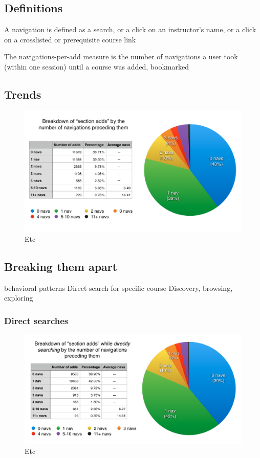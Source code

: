\subsection{Definitions}

A navigation is defined as
a search, or
a click on an instructor’s name, or
a click on a crosslisted or prerequisite course link

The navigations-per-add measure is
the number of navigations a user took (within one session) until a course was added, bookmarked

\subsection{Trends}

\begin{figure}
  \centering
  \includegraphics[width=1.0\textwidth]{images/graph/combined_navs}

  \caption{Etc}
  \label{fig:searchtypes}
\end{figure}

\subsection{Breaking them apart}

  behavioral patterns
  Direct search for specific course
  Discovery, browsing, exploring

  \subsubsection{Direct searches}

  \begin{figure}
    \centering
    \includegraphics[width=1.0\textwidth]{images/graph/direct_navs}

    \caption{Etc}
    \label{fig:searchtypes}
  \end{figure}

